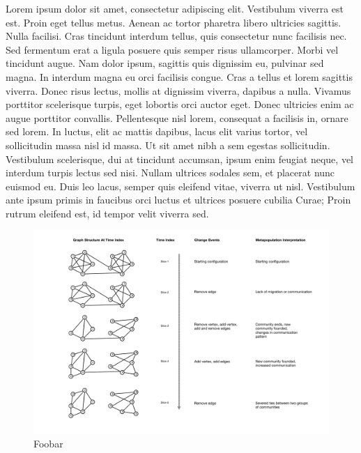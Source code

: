 \documentclass[graybox,natbib]{svmult}
\begin{document}
Lorem ipsum dolor sit amet, consectetur adipiscing elit. Vestibulum
viverra est est. Proin eget tellus metus. Aenean ac tortor pharetra
libero ultricies sagittis. Nulla facilisi. Cras tincidunt interdum
tellus, quis consectetur nunc facilisis nec. Sed fermentum erat a ligula
posuere quis semper risus ullamcorper. Morbi vel tincidunt augue. Nam
dolor ipsum, sagittis quis dignissim eu, pulvinar sed magna. In interdum
magna eu orci facilisis congue. Cras a tellus et lorem sagittis viverra.
Donec risus lectus, mollis at dignissim viverra, dapibus a nulla.
Vivamus porttitor scelerisque turpis, eget lobortis orci auctor eget.
Donec ultricies enim ac augue porttitor convallis. Pellentesque nisl
lorem, consequat a facilisis in, ornare sed lorem. In luctus, elit ac
mattis dapibus, lacus elit varius tortor, vel sollicitudin massa nisl id
massa. Ut sit amet nibh a sem egestas sollicitudin. Vestibulum
scelerisque, dui at tincidunt accumsan, ipsum enim feugiat neque, vel
interdum turpis lectus sed nisi. Nullam ultrices sodales sem, et
placerat nunc euismod eu. Duis leo lacus, semper quis eleifend vitae,
viverra ut nisl. Vestibulum ante ipsum primis in faucibus orci luctus et
ultrices posuere cubilia Curae; Proin rutrum eleifend est, id tempor
velit viverra sed.

\begin{figure}[ht]
\centering
\includegraphics[scale=0.25]{interval-temporal-network-with-interpretation.pdf}
\caption{Foobar}
\label{img:itn-example}
\end{figure}
\end{document}
